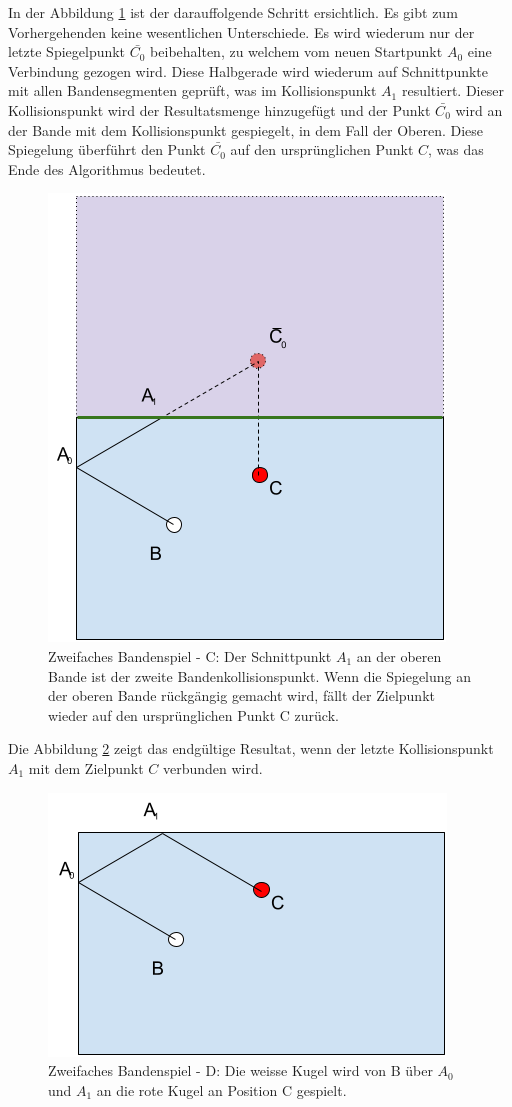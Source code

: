 \newpage
In der Abbildung \ref{fig:zweifaches_bandenspiel_c} ist der darauffolgende Schritt ersichtlich.
Es gibt zum Vorhergehenden keine wesentlichen Unterschiede.
Es wird wiederum nur der letzte Spiegelpunkt $\bar{C_0}$ beibehalten, zu welchem vom
neuen Startpunkt $A_0$ eine Verbindung gezogen wird.
Diese Halbgerade wird wiederum auf Schnittpunkte mit allen Bandensegmenten geprüft, was im Kollisionspunkt $A_1$ resultiert.
Dieser Kollisionspunkt wird der Resultatsmenge hinzugefügt und der Punkt $\bar{C_0}$
wird an der Bande mit dem Kollisionspunkt gespiegelt, in dem Fall der Oberen.
Diese Spiegelung überführt den Punkt $\bar{C_0}$ auf den ursprünglichen Punkt $C$, was das Ende des Algorithmus
bedeutet.
\begin{figure}[h]
    \begin{center}
        \includegraphics[width=0.5\linewidth]{../common/03_billiard_ai/resources/52_rail_reflection_2_c.png}
    \end{center}
    \caption{Zweifaches Bandenspiel - C: Der Schnittpunkt $A_1$ an der oberen Bande ist der zweite Bandenkollisionspunkt.
    Wenn die Spiegelung an der oberen Bande rückgängig gemacht wird, fällt der Zielpunkt wieder auf den ursprünglichen Punkt C zurück.}
    \label{fig:zweifaches_bandenspiel_c}
\end{figure}

Die Abbildung \ref{fig:zweifaches_bandenspiel_d} zeigt das endgültige Resultat, wenn der letzte Kollisionspunkt $A_1$
mit dem Zielpunkt $C$ verbunden wird.

\begin{figure}[h!]
    \begin{center}
        \includegraphics[width=0.5\linewidth]{../common/03_billiard_ai/resources/53_rail_reflection_2_d.png}
    \end{center}
    \caption{Zweifaches Bandenspiel - D: Die weisse Kugel wird von B über $A_0$ und $A_1$ an die rote Kugel an Position C gespielt.}
    \label{fig:zweifaches_bandenspiel_d}
\end{figure}

